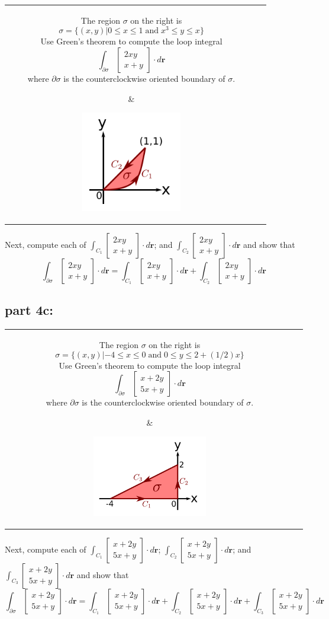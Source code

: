 \documentclass{article}
\newcommand{\colxyvec}[2]{\begin{bmatrix} #1 \\ #2 \end{bmatrix}}
\begin{document}
\begin{tabular}{cc}
\parbox{0.6\textwidth}{ 
The region \(\sigma\) on the right is 
\[\sigma = \{(x,y) | 0 \leq x \leq 1 \;\text{and}\; x^3 \leq y \leq x\}\]
Use Green's theorem to compute the loop integral
\[\int_{\partial\sigma} \colxyvec{2xy}{x+y} \cdot d\mathbf{r}\]
where \(\partial\sigma\) is the counterclockwise oriented boundary of \(\sigma\).
} & \parbox{0.4\textwidth}{
\includegraphics[width = 0.4\textwidth]{Test_bench_part_4x_images/Test_bench_part_4x_image_2}
}
\end{tabular}
Next, compute each of \(\int_{C_1} \colxyvec{2xy}{x+y} \cdot d\mathbf{r}\); and \(\int_{C_2} \colxyvec{2xy}{x+y} \cdot d\mathbf{r}\) and show that 
\[\int_{\partial\sigma} \colxyvec{2xy}{x+y} \cdot d\mathbf{r} = \int_{C_1} \colxyvec{2xy}{x+y} \cdot d\mathbf{r} + \int_{C_2} \colxyvec{2xy}{x+y} \cdot d\mathbf{r}\]  



\subsection*{part 4c:}

\begin{tabular}{cc}
\parbox{0.6\textwidth}{ 
The region \(\sigma\) on the right is 
\[\sigma = \{(x,y) | -4 \leq x \leq 0 \;\text{and}\; 0 \leq y \leq 2 + (1/2)x\}\]
Use Green's theorem to compute the loop integral
\[\int_{\partial\sigma} \colxyvec{x+2y}{5x+y} \cdot d\mathbf{r}\]
where \(\partial\sigma\) is the counterclockwise oriented boundary of \(\sigma\).
} & \parbox{0.4\textwidth}{
\includegraphics[width = 0.4\textwidth]{Test_bench_part_4x_images/Test_bench_part_4x_image_3}
}
\end{tabular}
Next, compute each of \(\int_{C_1} \colxyvec{x+2y}{5x+y} \cdot d\mathbf{r}\); \(\int_{C_2} \colxyvec{x+2y}{5x+y} \cdot d\mathbf{r}\); and \(\int_{C_3} \colxyvec{x+2y}{5x+y} \cdot d\mathbf{r}\) and show that 
\[\int_{\partial\sigma} \colxyvec{x+2y}{5x+y} \cdot d\mathbf{r} = \int_{C_1} \colxyvec{x+2y}{5x+y} \cdot d\mathbf{r} + \int_{C_2} \colxyvec{x+2y}{5x+y} \cdot d\mathbf{r} + \int_{C_3} \colxyvec{x+2y}{5x+y} \cdot d\mathbf{r}\]  
\end{document}
